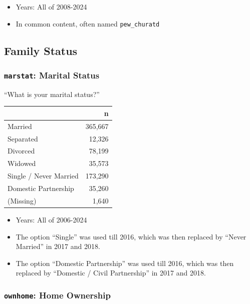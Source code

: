 \documentclass[10pt,article,oneside]{memoir}
\begin{document}
\begin{itemize}
\tightlist
\item
  Years: All of 2008-2024
\item
  In common content, often named \texttt{pew\_churatd}
\end{itemize}

\subsection{Family Status}\label{family-status}

\subsubsection{\texorpdfstring{\texttt{marstat}: Marital
Status}{marstat: Marital Status}}\label{marstat-marital-status}

``What is your marital status?''

\begin{table}[H]
\centering
\begin{tabular}[t]{lr}
\toprule
 & n\\
\midrule
Married & 365,667\\
Separated & 12,326\\
Divorced & 78,199\\
Widowed & 35,573\\
Single / Never Married & 173,290\\
Domestic Partnership & 35,260\\
(Missing) & 1,640\\
\bottomrule
\end{tabular}
\end{table}

\begin{itemize}
\tightlist
\item
  Years: All of 2006-2024
\item
  The option ``Single'' was used till 2016, which was then replaced by
  ``Never Married'' in 2017 and 2018.
\item
  The option ``Domestic Partnership'' was used till 2016, which was then
  replaced by ``Domestic / Civil Partnership'' in 2017 and 2018.
\end{itemize}

\subsubsection{\texorpdfstring{\texttt{ownhome}: Home
Ownership}{ownhome: Home Ownership}}\label{ownhome-home-ownership}
\end{document}
